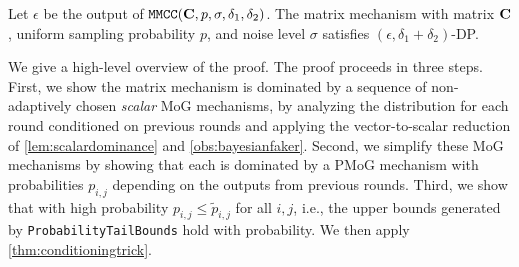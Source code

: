 \begin{thm}\label{thm:conditioning}
Let $\epsilon$ be the output of $\texttt{MMCC}{}(\mathbf{C}, p, \sigma, \delta_1, \delta_2)$. The matrix mechanism with matrix $\mathbf{C}$, uniform sampling probability $p$, and noise level $\sigma$ satisfies $(\epsilon, \delta_1 + \delta_2)$-DP.
\end{thm}
We give a high-level overview of the proof. The proof proceeds in three steps. First, we show the matrix mechanism is dominated by a sequence of non-adaptively chosen \textit{scalar} MoG mechanisms, by analyzing the distribution for each round conditioned on previous rounds and applying the vector-to-scalar reduction of \cref{lem:scalardominance} and \cref{obs:bayesianfaker}. Second, we simplify these MoG mechanisms by showing that each is dominated by a PMoG mechanism with probabilities $p_{i,j}$ depending on the outputs from previous rounds. 
Third, we show that with high probability $p_{i,j} \leq \tilde{p}_{i,j}$ for all $i,j$, i.e.,  the upper bounds generated by \texttt{ProbabilityTailBounds} hold with probability. We then apply \cref{thm:conditioningtrick}. 


